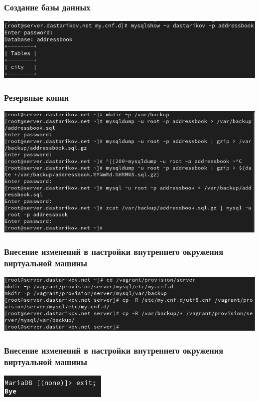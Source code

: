 \begin{frame}
\frametitle{Создание базы данных}
    \centering
    \includegraphics[width=\textwidth]{../images/image17.png}
\end{frame}

\begin{frame}
\frametitle{Резервные копии}
    \centering
    \includegraphics[width=\textwidth]{../images/image18.png}
\end{frame}

\begin{frame}
\frametitle{Внесение изменений в настройки внутреннего окружения виртуальной машины}
    \centering
    \includegraphics[width=\textwidth]{../images/image19.png}
\end{frame}

\begin{frame}
\frametitle{Внесение изменений в настройки внутреннего окружения виртуальной машины}
    \centering
    \includegraphics[width=\textwidth]{../images/image07.png}
\end{frame}

